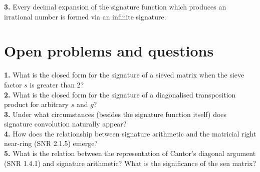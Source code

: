 \documentclass{article}
\begin{document}
\noindent \textbf{3.} Every decimal expansion of the signature function which produces an irrational number is formed via an infinite signature.

\section{Open problems and questions}

\textbf{1.} What is the closed form for the signature of a sieved matrix when the sieve factor $s$ is greater than 2?\\

\noindent \textbf{2.} What is the closed form for the signature of a diagonalised transposition product for arbitrary $s$ and $g$?\\

\noindent \textbf{3.} Under what circumstances (besides the signature function itself) does signature convolution naturally appear?\\

\noindent \textbf{4.} How does the relationship between signature arithmetic and the matricial right near-ring (SNR 2.1.5) emerge?\\

\noindent \textbf{5.} What is the relation between the representation of Cantor's diagonal argument (SNR 1.4.1) and signature arithmetic? What is the significance of the sen matrix?\\
\end{document}
